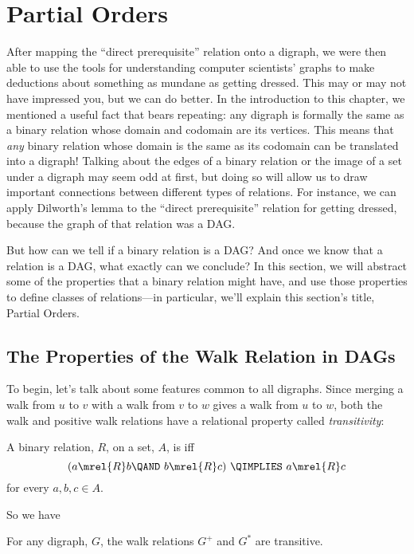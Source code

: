 \section{Partial Orders}

After mapping the ``direct prerequisite'' relation onto a digraph, we
were then able to use the tools for understanding computer scientists'
graphs to make deductions about something as mundane as getting
dressed.  This may or may not have impressed you, but we can do
better.  In the introduction to this chapter, we mentioned a useful
fact that bears repeating: any digraph is formally the same as a
binary relation whose domain and codomain are its vertices.  This
means that \emph{any} binary relation whose domain is the same as its
codomain can be translated into a digraph!  Talking about the edges of
a binary relation or the image of a set under a digraph may seem odd
at first, but doing so will allow us to draw important connections
between different types of relations.  For instance, we can apply
Dilworth's lemma to the ``direct prerequisite'' relation for getting
dressed, because the graph of that relation was a DAG.

But how can we tell if a binary relation is a DAG?  And once we know
that a relation is a DAG, what exactly can we conclude?  In this
section, we will abstract some of the properties that a binary
relation might have, and use those properties to define classes of
relations---in particular, we'll explain this section's title, Partial
Orders.

\subsection{The Properties of the Walk Relation in DAGs}

To begin, let's talk about some features common to all digraphs.
Since merging a walk from $u$ to $v$ with a walk from $v$ to $w$ gives
a walk from $u$ to $w$, both the walk and positive walk relations have
a relational property called \emph{transitivity}:

\begin{definition}
A binary relation, $R$, on a set, $A$, is
 iff
\[
(a \mrel{R}  b \QAND\ b \mrel{R}  c)\ \QIMPLIES\  a \mrel{R}  c
\]
\quad for every $a,b,c\in A$.
\end{definition}
So we have
\begin{lemma}
For any digraph, $G$, the walk relations $G^+$ and $G^*$ are transitive.
\end{lemma}

